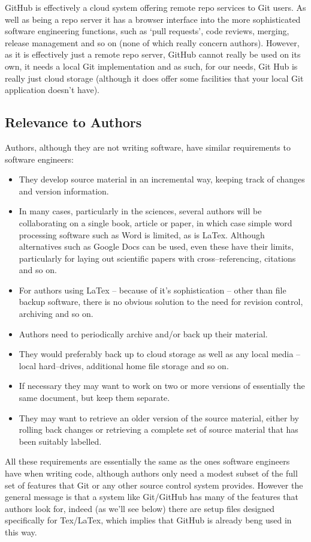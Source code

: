 \documentclass[a4paper, 12pt]{article}
\begin{document}
GitHub is effectively a cloud system offering remote repo services to Git users. As well as being a repo server it has a browser interface into the more sophisticated software engineering functions, such as `pull requests', code reviews, merging, release management and so on (none of which really concern authors). However, as it is  effectively just a remote repo server, GitHub cannot really be used on its own, it needs a local Git implementation and as such, for our needs, Git Hub is really just cloud storage (although it does offer some facilities that your local Git application doesn't have).

\subsection{Relevance to Authors}
Authors, although they are not writing software, have similar requirements to software engineers:
\begin{itemize}
\item They develop source material in an incremental way, keeping track of changes and version information.
\item In many cases, particularly in the sciences, several authors will be collaborating on a single book, article or paper, in which case simple word processing software such as Word is limited, as is LaTex. Although alternatives such as Google Docs can be used, even these have their limits, particularly for laying out scientific papers with cross--referencing, citations and so on.
\item For authors using LaTex -- because of it's sophistication -- other than file backup software, there is no obvious solution to the need for revision control, archiving and so on.
\item Authors need to periodically archive and/or back up their material.
\item They would preferably back up to cloud storage as well as any local media -- local hard--drives, additional home file storage and so on.
\item If necessary they may want to work on two or more versions of essentially the same document, but keep them separate.
\item They may want to retrieve an older version of the source material, either by rolling back changes or retrieving a complete set of source material that has been suitably labelled.
\end{itemize}
All these requirements are essentially the same as the ones software engineers have when writing code, although authors only need a modest subset of the full set of features that Git or any other source control system provides. However the general message is that a system like Git/GitHub has many of the features that authors look for, indeed (as we'll see below) there are setup files designed specifically for Tex/LaTex, which implies that GitHub is already beng used in this way.
\end{document}
